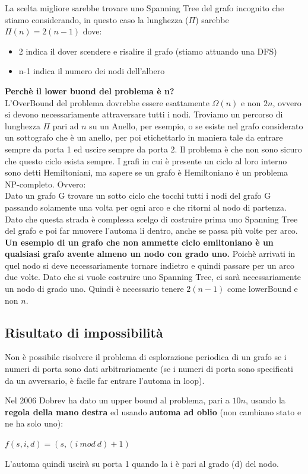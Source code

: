 La scelta migliore sarebbe trovare uno Spanning Tree del grafo incognito che stiamo considerando, in questo caso la lunghezza ($\Pi$) sarebbe $\Pi(n) = 2(n-1)$ dove:
\begin{itemize}
    \item 2 indica il dover scendere e risalire il grafo (stiamo attuando una DFS)
    \item n-1 indica il numero dei nodi dell'albero
\end{itemize}
\textbf{Perchè il lower buond del problema è n?}\\
L'OverBound del problema dovrebbe essere esattamente $\Omega(n)$ e non $2n$, ovvero si devono necessariamente attraversare tutti i nodi. Troviamo un percorso di lunghezza $\Pi$ pari ad $n$ su un Anello, per esempio, o se esiste nel grafo considerato un sottografo che è un anello, per poi etichettarlo in maniera tale da entrare sempre da porta 1 ed uscire sempre da porta 2. Il problema è che non sono sicuro che questo ciclo esista sempre. I grafi in cui è presente un ciclo al loro interno sono detti Hemiltoniani, ma sapere se un grafo è Hemiltoniano è un problema NP-completo. Ovvero:\\ Dato un grafo G trovare un sotto ciclo che tocchi tutti i nodi del grafo G passando solamente una volta per ogni arco e che ritorni al nodo di partenza.\\
Dato che questa strada è complessa scelgo di costruire prima uno Spanning Tree del grafo e poi far muovere l'automa li dentro, anche se passa più volte per arco.
\\\textbf{Un esempio di un grafo che non ammette ciclo emiltoniano è un qualsiasi grafo avente almeno un nodo con grado uno.} Poichè arrivati in quel nodo si deve necessariamente tornare indietro e quindi passare per un arco due volte. Dato che si vuole costruire uno Spanning Tree, ci sarà necessariamente un nodo di grado uno. Quindi è necessario tenere $2(n-1)$ come lowerBound e non $n$.

\subsection*{Risultato di impossibilità}
Non è possibile risolvere il problema di esplorazione periodica di un grafo se i numeri di porta sono dati arbitrariamente (se i numeri di porta sono specificati da un avversario, è facile far entrare l'automa in loop).

Nel 2006 Dobrev ha dato un upper bound al problema, pari a $10n$, usando la \textbf{regola della mano destra} ed usando \textbf{automa ad oblio} (non cambiano stato e ne ha solo uno):
\begin{center}
 $f(s,i,d) = (s,(i~mod~d) + 1)$
\end{center}
L'automa quindi uscirà su porta 1 quando la i è pari al grado (d) del nodo.

